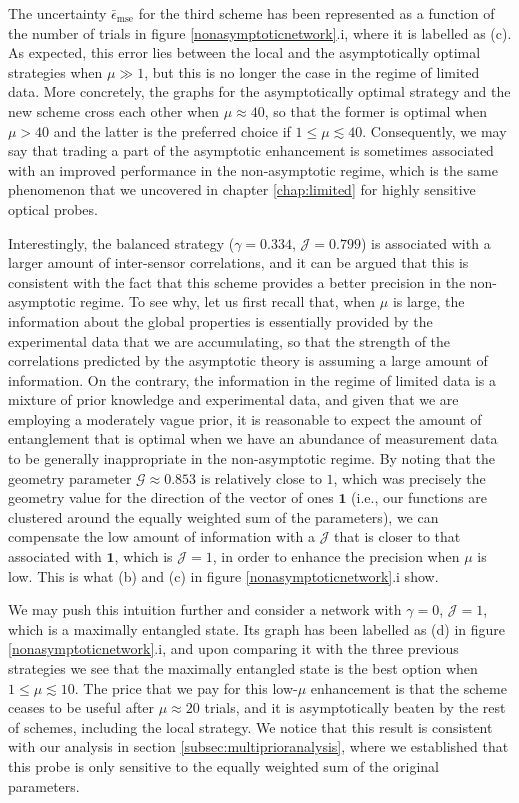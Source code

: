The uncertainty $\bar{\epsilon}_{\mathrm{mse}}$ for the third scheme has been represented as a function of the number of trials in figure \ref{nonasymptoticnetwork}.i, where it is labelled as (c). As expected, this error lies between the local and the asymptotically optimal strategies when $\mu \gg 1$, but this is no longer the case in the regime of limited data. More concretely, the graphs for the asymptotically optimal strategy and the new scheme cross each other when $\mu \approx 40$, so that the former is optimal when $\mu > 40$ and the latter is the preferred choice if $1 \leqslant \mu \lesssim 40$. Consequently, we may say that trading a part of the asymptotic enhancement is sometimes associated with an improved performance in the non-asymptotic regime, which is the same phenomenon that we uncovered in chapter \ref{chap:limited} for highly sensitive optical probes.

Interestingly, the balanced strategy ($\gamma = 0.334$, $\mathcal{J} = 0.799$) is associated with a larger amount of inter-sensor correlations, and it can be argued that this is consistent with the fact that this scheme provides a better precision in the non-asymptotic regime. To see why, let us first recall that, when $\mu$ is large, the information about the global properties is essentially provided by the experimental data that we are accumulating, so that the strength of the correlations predicted by the asymptotic theory is assuming a large amount of information. On the contrary, the information in the regime of limited data is a mixture of prior knowledge and experimental data, and given that we are employing a moderately vague prior, it is reasonable to expect the amount of entanglement that is optimal when we have an abundance of measurement data to be generally inappropriate in the non-asymptotic regime. By noting that the geometry parameter $\mathcal{G} \approx 0.853$ is relatively close to $1$, which was precisely the geometry value for the direction of the vector of ones $\boldsymbol{1}$ (i.e., our functions are clustered around the equally weighted sum of the parameters), we can compensate the low amount of information with a $\mathcal{J}$ that is closer to that associated with $\boldsymbol{1}$, which is $\mathcal{J} = 1$, in order to enhance the precision when $\mu$ is low. This is what (b) and (c) in figure \ref{nonasymptoticnetwork}.i show. 

We may push this intuition further and consider a network with $\gamma = 0$, $\mathcal{J} = 1$, which is a maximally entangled state. Its graph has been labelled as (d) in figure \ref{nonasymptoticnetwork}.i, and upon comparing it with the three previous strategies we see that the maximally entangled state is the best option when $1 \leqslant \mu \lesssim 10$. The price that we pay for this low-$\mu$ enhancement is that the scheme ceases to be useful after $\mu \approx 20$ trials, and it is asymptotically beaten by the rest of schemes, including the local strategy. We notice that this result is consistent with our analysis in section \ref{subsec:multiprioranalysis}, where we established that this probe is only sensitive to the equally weighted sum of the original parameters. 

